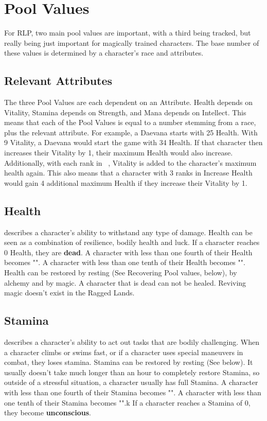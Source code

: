\section{Pool Values}\label{sec:pools}
For RLP, two main pool values are important, with a third being tracked, but really being just important for magically trained characters.
The base number of these values is determined by a character's race and attributes.\\

\subsection{Relevant Attributes}\label{subsec:relevantAttributesPools}
The three Pool Values are each dependent on an Attribute.
Health depends on Vitality, Stamina depends on Strength, and Mana depends on Intellect.
This means that each of the Pool Values is equal to a number stemming from a race, plus the relevant attribute.
For example, a Daevana starts with 25 Health.
With 9 Vitality, a Daevana would start the game with 34 Health.
If that character then increases their Vitality by 1, their maximum Health would also increase.
Additionally, with each rank in ~, Vitality is added to the character's maximum health again.
This also means that a character with 3 ranks in Increase Health would gain 4 additional maximum Health if they increase their Vitality by 1.

\subsection{Health}\label{pool:health} describes a character's ability to withstand any type of damage.
Health can be seen as a combination of resilience, bodily health and luck.
If a character reaches 0 Health, they are \textbf{dead}.
A character with less than one fourth of their Health becomes "".
A character with less than one tenth of their Health becomes "".
Health can be restored by resting (See Recovering Pool values, below), by alchemy and by magic.
A character that is dead can not be healed.
Reviving magic doesn't exist in the Ragged Lands.\\

\subsection{Stamina}\label{pool:stamina} describes a character's ability to act out tasks that are bodily challenging.
When a character climbs or swims fast, or if a character uses special maneuvers in combat, they loses stamina.
Stamina can be restored by resting (See below).
It usually doesn't take much longer than an hour to completely restore Stamina, so outside of a stressful situation, a character usually has full Stamina.
A character with less than one fourth of their Stamina becomes "".
A character with less than one tenth of their Stamina becomes "".k
If a character reaches a Stamina of 0, they become \textbf{unconscious}.\\

